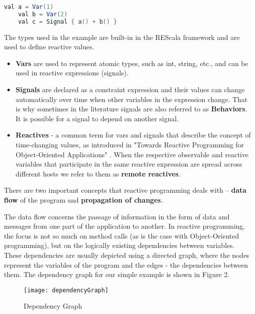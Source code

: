 \documentclass{sigplanconf}
\begin{document}
\begin{lstlisting}[frame=single,caption={Reactive Sum},captionpos=b,linewidth=\columnwidth, basicstyle=\small, language=java, morekeywords={val, Signal}, keywordstyle=\color{blue}]
	val a = Var(1)
	val b = Var(2)
	val c = Signal { a() + b() }
\end{lstlisting}

The types used in the example are built-in in the REScala framework and are used to define reactive values.

\begin{itemize} \itemsep1pt \parskip0pt 
  \item \textbf{Vars} are used to represent atomic types, such as int, string, etc., and can be used in reactive expressions (signals).
  \item \textbf{Signals} are declared as a constraint expression and their values can change automatically over time when other variables in the expression change. That is why sometimes in the literature signals are also referred to as \textbf{Behaviors}. It is possible for a signal to depend on another signal. 
  \item \textbf{Reactives} - a common term for vars and signals that describe the concept of time-changing values, as introduced in "Towards Reactive Programming for Object-Oriented Applications" \cite{towards}. When the respective observable and reactive variables that participate in the same reactive expression are spread across different hosts we refer to them as \textbf{remote reactives}.

\end{itemize}

There are two important concepts that reactive programming deals with -- \textbf{data flow} of the program and \textbf{propagation of changes}.

The data flow concerns the passage of information in the form of data and messages from one part of the application to another. In reactive programming, the focus is not so much on method calls (as is the case with Object-Oriented programming), but on the logically existing dependencies between variables. These dependencies are usually depicted using a directed graph, where the nodes represent the variables of the program and the edges - the dependencies between them. The dependency graph for our simple example is shown in Figure 2.

\begin{figure}
\centering
\texttt{[image: dependencyGraph]}
\caption{Dependency Graph}
\end{figure}
\end{document}
